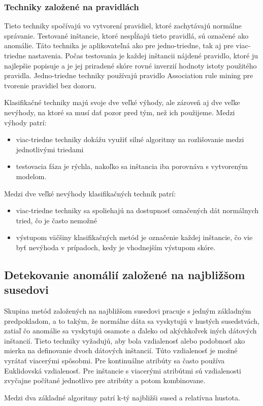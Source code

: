 \subsubsection{Techniky založené na pravidlách}
Tieto techniky spočívajú vo vytvorení pravidiel, ktoré zachytávajú normálne správanie. Testované inštancie, ktoré nespĺňajú tieto pravidlá, sú označené ako anomálie. Táto technika je aplikovateľná ako pre jedno-triedne, tak aj pre viac-triedne nastavenia. Počas testovania je každej inštancii nájdené pravidlo, ktoré ju najlepšie popisuje a je jej priradené skóre rovné inverzií hodnoty istoty použitého pravidla. Jedno-triedne techniky používajú pravidlo Association rule mining pre tvorenie pravidiel bez dozoru.\cite{Chandola}\par
Klasifikačné techniky majú svoje dve veľké výhody, ale zároveň aj dve veľke nevýhody, na ktoré sa musí dať pozor pred tým, než ich použijeme. Medzi výhody patrí:
\begin{itemize}
    \item viac-triedne techniky dokážu využiť silné algoritmy na rozlišovanie medzi
jednotlivými triedami
    \item testovacia fáza je rýchla, nakoľko sa inštancia iba porovnáva s vytvoreným
modelom.
\end{itemize}
Medzi dve veľké nevýhody klasifikačných techník patrí:
\begin{itemize}
    \item  viac-triedne techniky sa spoliehajú na dostupnosť označených dát normálnych tried, čo je často nemožné
    \item výstupom väčšiny klasifikačných metód je označenie každej inštancie, čo vie
byť nevýhoda v prípadoch, kedy je vhodnejším výstupom skóre.

\end{itemize}
\cite{Chandola}
\subsection{Detekovanie anomálií založené na najbližšom susedovi}
Skupina metód založených na najbližšom susedovi pracuje s jedným základným
predpokladom, a to takým, že normálne dáta sa vyskytujú v hustých susedstvách, zatiaľ čo
anomálie sa vyskytujú osamote a ďaleko od akýchkoľvek iných dátových inštancií. Tieto techniky vyžadujú, aby bola vzdialenosť alebo podobnosť ako mierka na definovanie dvoch dátových inštancií. Túto vzdialenosť je možné vyrátať viacerými spôsobmi. Pre kontinuálne atribúty sa často používa Euklidovská vzdialenosť. Pre inštancie s viacerými atribútmi sú vzdialenosti zvyčajne počítané jednotlivo
pre atribúty a potom kombinovane.\cite{Chandola}\par
Medzi dva základné algoritmy patrí k-tý najbližši sused a relatívna hustota.
